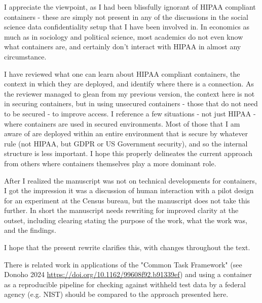 \begin{response}
    I appreciate the viewpoint, as I had been blissfully ignorant of HIPAA  compliant containers - these are simply not present in any of the discussions in the social science data confidentiality setup that I have been involved in. In economics as much as in sociology and political science, most academics do not even know what containers are, and certainly don't interact with HIPAA in almost any circumstance.

    I have reviewed what one can learn about HIPAA compliant containers, the context in which they are deployed, and identify where there is a connection. As the reviewer managed to glean from my previous version, the context here is not in securing containers, but in using unsecured containers - those that do not need to be secured - to improve access. I reference a few situations - not just HIPAA - where containers are used in secured environments. Most of those that I am aware of are deployed within an entire environment that is secure by whatever rule (not HIPAA, but GDPR or US Government security), and so the internal structure is less important. I hope this properly delineates the current approach from others where containers themselves play a more dominant role.
\end{response}

\begin{referee}
    
After I realized the manuscript was not on
technical developments for containers, I got the impression it was a discussion of human interaction
with a pilot design for an experiment at the Census bureau, but the manuscript
does not take this further. In short the manuscript needs rewriting for improved clarity at the outset,
including clearing stating the purpose of the work, what the work was, and the findings.

\end{referee}

\begin{response}
    I hope that the present rewrite clarifies this, with changes throughout the text.
\end{response}

\begin{referee}
    
There is
related work in applications of the "Common Task Framework" (see Donoho 2024 \url{https://doi.org/10.1162/99608f92.b91339ef})
and using a container as a reproducible pipeline for checking against withheld test data by a federal
agency (e.g. NIST) should be compared to the approach presented here. 

\end{referee}

